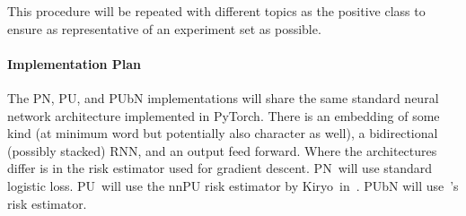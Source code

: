 \documentclass[10pt]{article}
\begin{document}
  \noindent
  This procedure will be repeated with different topics as the positive class to ensure as representative of an experiment set as possible.

  \paragraph{Implementation Plan} The PN, PU, and PUbN implementations will share the same standard neural network architecture implemented in PyTorch.  There is an embedding of some kind (at minimum word but potentially also character as well), a bidirectional (possibly stacked) RNN, and an output feed forward. Where the architectures differ is in the risk estimator used for gradient descent.  PN~will use standard logistic loss.  PU~will use the nnPU risk estimator by Kiryo\etal\ in~\cite{Kiryo:2017}.  PUbN will use~\cite{Hsieh:2019}'s risk estimator.

  
  
\end{document}

